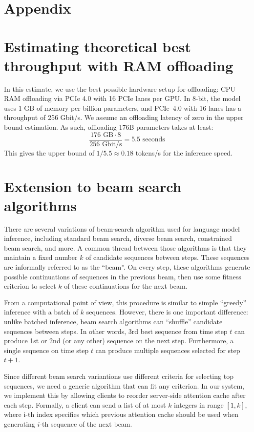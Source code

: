 \clearpage

\section*{Appendix}




\section{Estimating theoretical best throughput with RAM offloading}\label{appendix:offloading_estimate}
In this estimate, we use the best possible hardware setup for offloading: CPU RAM offloading via PCIe 4.0 with 16 PCIe lanes per GPU.
In 8-bit, the model uses 1 GB of memory per billion parameters, and PCIe~4.0 with 16 lanes has a throughput of 256 Gbit/s. We assume an offloading latency of zero in the upper bound estimation. As such, offloading 176B parameters takes at least:
$$\frac{176 \text{ GB} \cdot 8}{256 \text{ Gbit/s}} = 5.5\text{ seconds}$$
This gives the upper bound of $1 / 5.5 \approx 0.18$ tokens/s for the inference speed.

\section{Extension to beam search algorithms}\label{appendix:beam_search}

There are several variations of beam-search algorithm used for language model inference, including standard beam search, diverse beam search, constrained beam search, and more. A common thread between those algorithms is that they maintain a fixed number $k$ of candidate sequences between steps. These sequences are informally referred to as the ``beam''. On every step, these algorithms generate possible continuations of sequences in the previous beam, then use some fitness criterion to select $k$ of these continuations for the next beam.

From a computational point of view, this procedure is similar to simple ``greedy'' inference with a batch of $k$ sequences. However, there is one important difference: unlike batched inference, beam search algorithms can ``shuffle'' candidate sequences between steps. In other words, 3rd best sequence from time step $t$ can produce 1st or 2nd (or any other) sequence on the next step. Furthermore, a single sequence on time step $t$ can produce multiple sequences selected for step $t+1$.

Since different beam search variantions use different criteria for selecting top sequences, we need a generic algorithm that can fit any criterion. In our system, we implement this by allowing clients to reorder server-side attention cache after each step. Formally, a client can send a list of at most $k$ integers in range $[1, k]$, where i-th index specifies which previous attention cache should be used when generating $i$-th sequence of the next beam.

